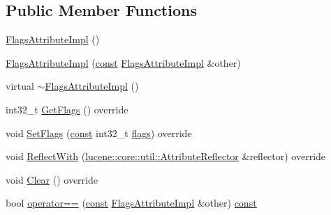 \subsection*{Public Member Functions}
\begin{DoxyCompactItemize}
\item 
\mbox{\hyperlink{classlucene_1_1core_1_1analysis_1_1tokenattributes_1_1FlagsAttributeImpl_ac662a6d0887c9ffc42e3ef1ccc3f4256}{Flags\+Attribute\+Impl}} ()
\item 
\mbox{\hyperlink{classlucene_1_1core_1_1analysis_1_1tokenattributes_1_1FlagsAttributeImpl_ab9606f6a419551870e3c3233ff7a7954}{Flags\+Attribute\+Impl}} (\mbox{\hyperlink{ZlibCrc32_8h_a2c212835823e3c54a8ab6d95c652660e}{const}} \mbox{\hyperlink{classlucene_1_1core_1_1analysis_1_1tokenattributes_1_1FlagsAttributeImpl}{Flags\+Attribute\+Impl}} \&other)
\item 
virtual \mbox{\hyperlink{classlucene_1_1core_1_1analysis_1_1tokenattributes_1_1FlagsAttributeImpl_a643fd4820ca208193923bb08a10ac889}{$\sim$\+Flags\+Attribute\+Impl}} ()
\item 
int32\+\_\+t \mbox{\hyperlink{classlucene_1_1core_1_1analysis_1_1tokenattributes_1_1FlagsAttributeImpl_aa3fb651752273e55f85419ef522eaa3e}{Get\+Flags}} () override
\item 
void \mbox{\hyperlink{classlucene_1_1core_1_1analysis_1_1tokenattributes_1_1FlagsAttributeImpl_a89376727686a4e0cc86db2154dc2ea49}{Set\+Flags}} (\mbox{\hyperlink{ZlibCrc32_8h_a2c212835823e3c54a8ab6d95c652660e}{const}} int32\+\_\+t \mbox{\hyperlink{classlucene_1_1core_1_1analysis_1_1tokenattributes_1_1FlagsAttributeImpl_ac0a726a7b082414bcac0d9a5dc9ab4bb}{flags}}) override
\item 
void \mbox{\hyperlink{classlucene_1_1core_1_1analysis_1_1tokenattributes_1_1FlagsAttributeImpl_aa479cdc4474246af90f7d54ca64d3a48}{Reflect\+With}} (\mbox{\hyperlink{namespacelucene_1_1core_1_1util_a7dbb701adaed055f73fb95eec83da10a}{lucene\+::core\+::util\+::\+Attribute\+Reflector}} \&reflector) override
\item 
void \mbox{\hyperlink{classlucene_1_1core_1_1analysis_1_1tokenattributes_1_1FlagsAttributeImpl_a67ed39990f3f9eac90c91e880ad5cc31}{Clear}} () override
\item 
bool \mbox{\hyperlink{classlucene_1_1core_1_1analysis_1_1tokenattributes_1_1FlagsAttributeImpl_a93a0ee49b92c39e0a0d55c1f061f0ac2}{operator==}} (\mbox{\hyperlink{ZlibCrc32_8h_a2c212835823e3c54a8ab6d95c652660e}{const}} \mbox{\hyperlink{classlucene_1_1core_1_1analysis_1_1tokenattributes_1_1FlagsAttributeImpl}{Flags\+Attribute\+Impl}} \&other) \mbox{\hyperlink{ZlibCrc32_8h_a2c212835823e3c54a8ab6d95c652660e}{const}}

\end{DoxyCompactItemize}
